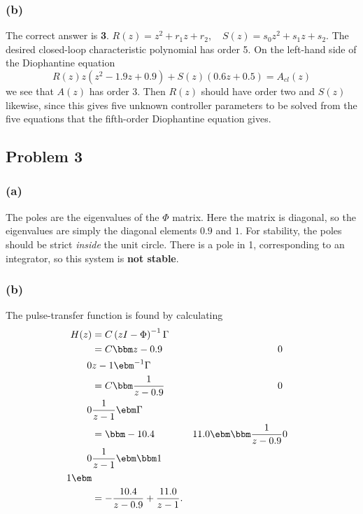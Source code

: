\documentclass[a4paper]{scrartcl}
\begin{document}
\subsubsection*{(b)}
\label{sec-4-2-2}
The correct answer is \textbf{3}.  \(R(z) = z^2 + r_1z + r_2, \quad S(z) = s_0z^2 + s_1z + s_2 \). The desired closed-loop characteristic polynomial has order 5. On the left-hand side of the Diophantine equation 
\[ R(z) z \left(z^{2} - 1.9 z + 0.9\right) + S(z) \left(0.6 z + 0.5\right) = A_{cl}(z) \]
we see that $A(z)$ has order 3. Then $R(z)$ should have order two and $S(z)$ likewise, since this gives five unknown controller parameters to be solved from the five equations that the fifth-order Diophantine equation gives. 

\subsection*{Problem 3}
\label{sec-4-3}
\subsubsection*{(a)}
\label{sec-4-3-1}
The poles are the eigenvalues of the $\Phi$ matrix. Here the matrix is diagonal, so the eigenvalues are simply the diagonal elements $0.9$ and $1$. For stability, the poles should be strict \emph{inside} the unit circle. There is a pole in 1, corresponding to an integrator, so this system is \textbf{not stable}.

\subsubsection*{(b)}
\label{sec-4-3-2}
The pulse-transfer function is found by calculating
\begin{equation*}
  \begin{split}
 H(z) &= C \left( zI - \Phi\right)^{-1} \Gamma\\
      &= C \bbm z-0.9 & 0\\0 & z-1 \ebm ^{-1} \Gamma \\
      &= C \bbm \frac{1}{z-0.9} & 0\\ 0 & \frac{1}{z-1} \ebm \Gamma \\
      &= \bbm -10.4 & 11.0 \ebm \bbm \frac{1}{z-0.9} & 0\\ 0 & \frac{1}{z-1} \ebm \bbm 1\\1\ebm \\
      &= - \frac{10.4}{z-0.9} + \frac{11.0}{z-1}.
  \end{split}
 \end{equation*}
\end{document}
